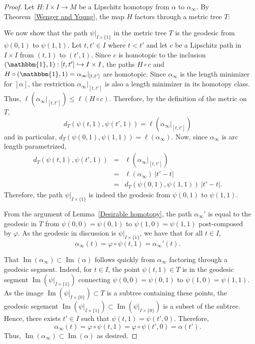\documentclass{article}
\theoremstyle{definition}
\theoremstyle{remark}
\def\id{\mathbbm{1}}
\DeclareMathOperator{\Ima}{Im}
\newcommand{\length}[1]{\ell}%
\newcommand{\core}[1]{{#1}_\infty}
\begin{document}
\begin{proof} %
Let $H:I\times I\rightarrow M$ be a Lipschitz homotopy from $\alpha$ to $\core{\alpha}$. By Theorem~\ref{Wenger and Young}, the map $H$ factors through a metric tree $T$:
\begin{center}
\end{center}

We now show that the path $\psi|_{I\times\{1\}}$ in the metric tree $T$ is the geodesic from $\psi(0,1)$ to $\psi(1,1)$. Let $t,t'\in I$ where $t<t'$ and let $c$ be a Lipschitz path in $I\times I$ from $(t,1)$ to $(t',1)$. Since $c$ is homotopic to the inclusion $(\id,1):[t,t']\hookrightarrow I\times I$, the paths $H\circ c$ and $H\circ(\id,1)=\core{\alpha}|_{[t,t']}$ are homotopic. Since $\core{\alpha}$ is the length minimizer for $[\alpha]$, the restriction $\core{\alpha}|_{[t,t']}$ is also a length minimizer in its homotopy class. Thus, $\length{M}(\core{\alpha}|_{[t,t']})\leq\length{M}(H\circ c)$. Therefore, by the definition of the metric on $T$, %
\[
d_T(\psi(t,1),\psi(t',1))=\length{M}\left(\core{\alpha}|_{[t,t']}\right)
\]
and in particular, $d_T(\psi(0,1),\psi(1,1))=\length{M}(\core{\alpha}).$ Now, since $\core{\alpha}$ is arc length parametrized,
\begin{eqnarray*}
d_T(\psi(t,1),\psi(t',1)) & = & \length{M}\left(\core{\alpha}|_{[t,t']}\right) \\
					 & = & \length{M}(\core{\alpha})~|t'-t| \\
					 & = & d_T(\psi(0,1),\psi(1,1))~|t'-t|.
\end{eqnarray*}
Therefore, the path $\psi|_{I\times\{1\}}$ is indeed the geodesic from $\psi(0,1)$ to $\psi(1,1)$. 

From the argument of Lemma~\ref{Desirable homotopy}, the path $\core{\alpha}'$ is equal to the geodesic in $T$ from $\psi(0,0)=\psi(0,1)$ to $\psi(1,0)=\psi(1,1)$ post-composed by $\varphi$. As the geodesic in discussion is $\psi|_{I\times\{1\}}$, we have that for all $t\in I$,
\[
\core{\alpha}(t)=\varphi\circ\psi(t,1)=\core{\alpha}'(t).
\]

That  $\Ima(\core{\alpha})\subset\Ima(\alpha)$ follows quickly from $\core{\alpha}$ factoring through a geodesic segment. Indeed, for $t\in I$, the point $\psi(t,1)\in T$ is in the geodesic segment $\Ima(\psi|_{I\times\{1\}})$ connecting $\psi(0,0)=\psi(0,1)$ to $\psi(1,0)=\psi(1,1)$. As the image $\Ima(\psi|_{I\times\{0\}})\subset T$ is a subtree containing these points, the geodesic segement $\Ima(\psi|_{I\times\{1\}})\subset\Ima(\psi|_{I\times\{0\}})$ is a subset of the subtree. Hence, there exists $t'\in I$ such that $\psi(t,1)=\psi(t',0)$. Therefore,
\[
\core{\alpha}(t)=\varphi\circ\psi(t,1)=\varphi\circ\psi(t',0)=\alpha(t').
\]
Thus, $\Ima(\core{\alpha})\subset\Ima(\alpha)$ as desired.

\end{proof}
\end{document}
